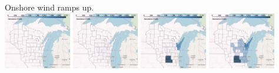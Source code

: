 \documentclass[xcolor=dvipsnames]{beamer}
\begin{document}
\begin{frame}
  Onshore wind ramps up. \\
  \includegraphics[width=0.22\textwidth]{includes/no_leakage_no_shutdowns_wind_r0.png}
  \includegraphics[width=0.22\textwidth]{includes/no_leakage_no_shutdowns_wind_r2.png}
  \includegraphics[width=0.22\textwidth]{includes/no_leakage_no_shutdowns_wind_r3.png}
  \includegraphics[width=0.22\textwidth]{includes/no_leakage_no_shutdowns_wind_r4.png}
\end{frame}
\end{document}
